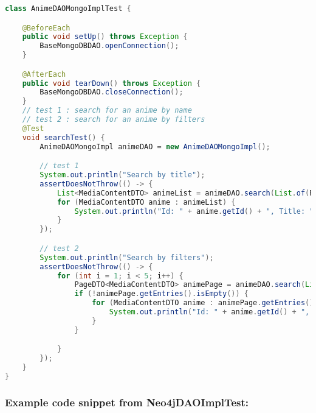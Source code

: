 \begin{mdframed}[style=customstyle]
\begin{lstlisting}[language=java]
class AnimeDAOMongoImplTest {

    @BeforeEach
    public void setUp() throws Exception {
        BaseMongoDBDAO.openConnection();
    }

    @AfterEach
    public void tearDown() throws Exception {
        BaseMongoDBDAO.closeConnection();
    }
    // test 1 : search for an anime by name
    // test 2 : search for an anime by filters
    @Test
    void searchTest() {
        AnimeDAOMongoImpl animeDAO = new AnimeDAOMongoImpl();

        // test 1
        System.out.println("Search by title");
        assertDoesNotThrow(() -> {
            List<MediaContentDTO> animeList = animeDAO.search(List.of(Pair.of("title", "Attack on Titan")), Map.of("title", 1), 1, false).getEntries();
            for (MediaContentDTO anime : animeList) {
                System.out.println("Id: " + anime.getId() + ", Title: " + anime.getTitle());
            }
        });

        // test 2
        System.out.println("Search by filters");
        assertDoesNotThrow(() -> {
            for (int i = 1; i < 5; i++) {
                PageDTO<MediaContentDTO> animePage = animeDAO.search(List.of(Pair.of("$in",Map.of("tags", List.of("school clubs", "manwha")))), Map.of("title", 1), i, false);
                if (!animePage.getEntries().isEmpty()) {
                    for (MediaContentDTO anime : animePage.getEntries()) {
                        System.out.println("Id: " + anime.getId() + ", Title: " + anime.getTitle());
                    }
                }

            }
        });
    }
}\end{lstlisting}
\end{mdframed}

\subsubsection*{Example code snippet from Neo4jDAOImplTest:}

